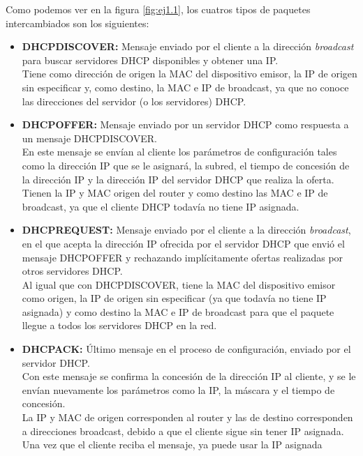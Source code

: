  Como podemos ver en la figura \ref{fig:ej1.1}, los cuatros tipos de paquetes intercambiados son los siguientes:
 \begin{itemize}
     \item \textbf{DHCPDISCOVER:} Mensaje enviado por el cliente a la dirección \textit{broadcast} para buscar servidores DHCP disponibles y obtener una IP.\\ Tiene como dirección de origen la MAC del dispositivo emisor, la IP de origen sin especificar y, como destino, la MAC e IP de broadcast, ya que no conoce las direcciones del servidor (o los servidores) DHCP.
     \item \textbf{DHCPOFFER:} Mensaje enviado por un servidor DHCP como respuesta a un mensaje DHCPDISCOVER.\\ En este mensaje se envían al cliente los parámetros de configuración tales como la dirección IP que se le asignará, la subred, el tiempo de concesión de la dirección IP y la dirección IP del servidor DHCP que realiza la oferta.\\ Tienen la IP y MAC origen del router y como destino las MAC e IP de broadcast, ya que el cliente DHCP todavía no tiene IP asignada.
     \item \textbf{DHCPREQUEST:} Mensaje enviado por el cliente a la dirección \textit{broadcast}, en el que acepta la dirección IP ofrecida por el servidor DHCP que envió el mensaje DHCPOFFER y rechazando implícitamente ofertas realizadas por otros servidores DHCP.\\ Al igual que con DHCPDISCOVER, tiene la MAC del dispositivo emisor como origen, la IP de origen sin especificar (ya que todavía no tiene IP asignada) y como destino la MAC e IP de broadcast para que el paquete llegue a todos los servidores DHCP en la red.
     \item \textbf{DHCPACK:} Último mensaje en el proceso de configuración, enviado por el servidor DHCP. \\
     Con este mensaje se confirma la concesión de la dirección IP al cliente, y se le envían nuevamente los parámetros como la IP, la máscara y el tiempo de concesión. \\
     La IP y MAC de origen corresponden al router y las de destino corresponden a direcciones broadcast, debido a que el cliente sigue sin tener IP asignada.\\ 
     Una vez que el cliente reciba el mensaje, ya puede usar la IP asignada
 \end{itemize}

 
